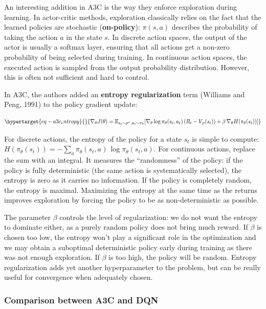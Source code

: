 \documentclass[
  letterpaper,
  DIV=11,
  numbers=noendperiod]{scrreprt}
\begin{document}
An interesting addition in A3C is the way they enforce exploration
during learning. In actor-critic methods, exploration classically relies
on the fact that the learned policies are stochastic
(\textbf{on-policy}): \(\pi(s, a)\) describes the probability of taking
the action \(a\) in the state \(s\). In discrete action spaces, the
output of the actor is usually a softmax layer, ensuring that all
actions get a non-zero probability of being selected during training. In
continuous action spaces, the executed action is sampled from the output
probability distribution. However, this is often not sufficient and hard
to control.

In A3C, the authors added an \textbf{entropy regularization} term
(Williams and Peng, 1991) to the policy gradient update:

\begin{equation}\protect\hypertarget{eq-a3c_entropy}{}{
    \nabla_\theta J(\theta) =  \mathbb{E}_{s_t \sim \rho^\pi, a_t \sim \pi_\theta}[\nabla_\theta \log \pi_\theta(s_t, a_t) \, ( R_t - V_\varphi(s_t)) + \beta \, \nabla_\theta H(\pi_\theta(s_t))]
}\label{eq-a3c_entropy}\end{equation}

For discrete actions, the entropy of the policy for a state \(s_t\) is
simple to compute:
\(H(\pi_\theta(s_t)) = - \sum_a \pi_\theta(s_t, a) \, \log \pi_\theta(s_t, a)\).
For continuous actions, replace the sum with an integral. It measures
the ``randomness'' of the policy: if the policy is fully deterministic
(the same action is systematically selected), the entropy is zero as it
carries no information. If the policy is completely random, the entropy
is maximal. Maximizing the entropy at the same time as the returns
improves exploration by forcing the policy to be as non-deterministic as
possible.

The parameter \(\beta\) controls the level of regularization: we do not
want the entropy to dominate either, as a purely random policy does not
bring much reward. If \(\beta\) is chosen too low, the entropy won't
play a significant role in the optimization and we may obtain a
suboptimal deterministic policy early during training as there was not
enough exploration. If \(\beta\) is too high, the policy will be random.
Entropy regularization adds yet another hyperparameter to the problem,
but can be really useful for convergence when adequately chosen.

\hypertarget{comparison-between-a3c-and-dqn}{%
\subsubsection*{Comparison between A3C and
DQN}\label{comparison-between-a3c-and-dqn}}
\end{document}
